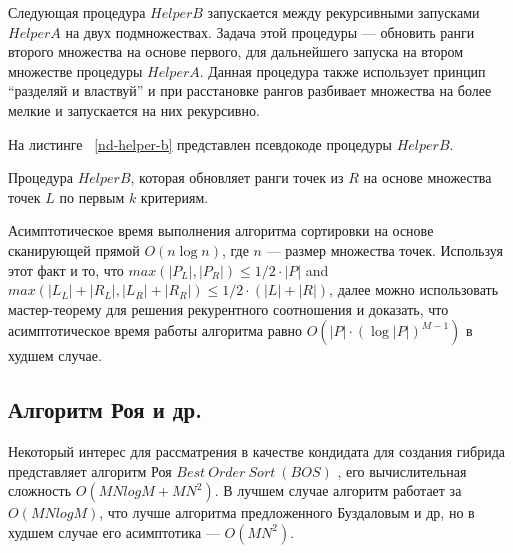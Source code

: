 Следующая процедура $HelperB$ запускается между рекурсивными запусками $HelperA$ на двух подмножествах. Задача этой процедуры {---} обновить ранги второго множества на основе первого, для дальнейшего запуска на втором множестве процедуры $HelperA$. Данная процедура также использует принцип ``разделяй и властвуй'' и при расстановке рангов разбивает множества на более мелкие и запускается на них рекурсивно.

На листинге ~\ref{nd-helper-b} представлен псевдокоде процедуры $HelperB$.

\begin{algorithm}
\begin{algorithmic}[1]
     \Return
    \EndIf
\EndProcedure
\end{algorithmic}
\caption{Процедура \textsc{$HelperB$}, которая обновляет ранги точек из $R$ на основе множества точек $L$ по первым $k$ критериям.}
\label{nd-helper-b}
\end{algorithm}

Асимптотическое время выполнения алгоритма сортировки на основе сканирующей прямой $O(n \log n)$, где $n$ {---} размер множества точек. Используя этот факт и то, что $max(|P_L|, |P_R|) \le 1/2 \cdot |P|$ and $max(|L_L| + |R_L|, |L_R| + |R_R|) \le 1/2 \cdot(|L| + |R|)$, далее можно использовать мастер-теорему\cite{Cormen} для решения рекурентного соотношения и доказать, что асимптотическое время работы алгоритма равно $O(|P| \cdot (\log|P|)^{M-1})$ в худшем случае.

\subsection{Алгоритм Роя и др.}

Некоторый интерес для рассматрения в качестве кондидата для создания гибрида представляет алгоритм Роя $Best~Order~Sort~(BOS)$ \cite{Roy}, его вычислительная сложность $O(MNlogM+MN^2)$. В лучшем случае алгоритм работает за $O(MNlogM)$, что лучше алгоритма предложенного Буздаловым и др, но в худшем случае его асимптотика {---} $O(MN^2)$. 

